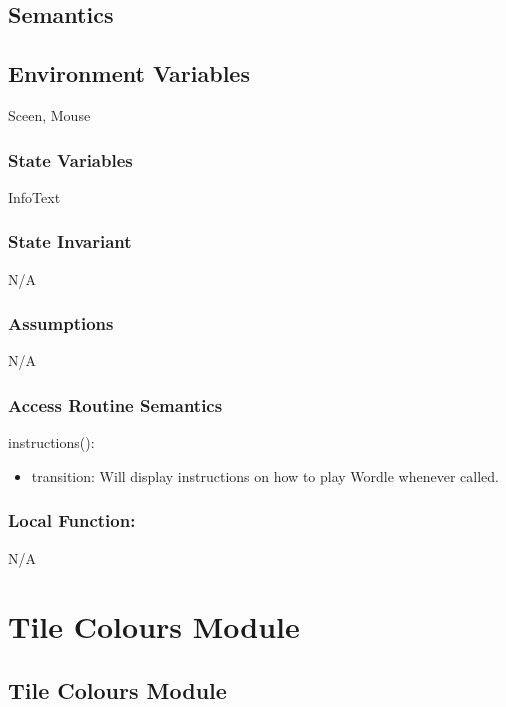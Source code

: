 \documentclass[12pt]{article}
\begin{document}
\subsection* {Semantics}

\subsection*{Environment Variables}

Sceen, Mouse

\subsubsection* {State Variables}
InfoText

\subsubsection* {State Invariant}

N/A

\subsubsection* {Assumptions}

N/A

\subsubsection* {Access Routine Semantics}

\noindent instructions():
\begin{itemize}
  \item transition: Will display instructions on how to play Wordle whenever called.
\end{itemize}

\subsubsection*{Local Function:}

N/A

\newpage

\section {Tile Colours Module}

\subsection* {Tile Colours Module}
\end{document}
